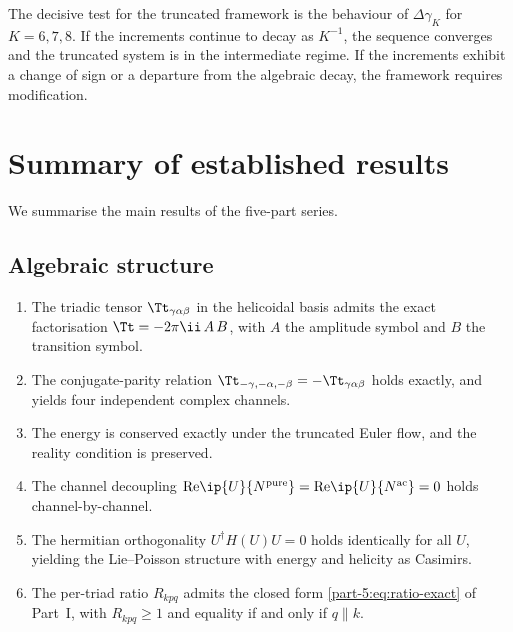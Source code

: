 \begin{remark}\label{part-5:rem:decisive}
The decisive test for the truncated framework is the behaviour of 
$\Delta\gamma_K$ for $K=6,7,8$. If the increments continue to decay 
as $K^{-1}$, the sequence converges and the truncated system is in 
the intermediate regime. If the increments exhibit a change of 
sign or a departure from the algebraic decay, the framework requires 
modification.
\end{remark}

\section{Summary of established results}
\label{part-5:sec:summary}

We summarise the main results of the five-part series.

\subsection{Algebraic structure}
\label{part-5:ssec:summary-algebraic}

\begin{enumerate}[label=(\Alph*),leftmargin=*]
\item The triadic tensor $\Tt_{\gamma\alpha\beta}$ in the helicoidal 
      basis admits the exact factorisation 
      $\Tt = -2\pi\ii\,A\,B$, with $A$ the amplitude symbol and $B$ 
      the transition symbol.
\item The conjugate-parity relation 
      $\Tt_{-\gamma,-\alpha,-\beta} = -\Tt_{\gamma\alpha\beta}$ holds 
      exactly, and yields four independent complex channels.
\item The energy is conserved exactly under the truncated Euler flow, 
      and the reality condition is preserved.
\item The channel decoupling 
      $\mathrm{Re}\ip{U}{N^{\mathrm{pure}}} = \mathrm{Re}\ip{U}{N^{\mathrm{ac}}} = 0$ 
      holds channel-by-channel.
\item The hermitian orthogonality $U^\dagger H(U)U = 0$ holds 
      identically for all $U$, yielding the Lie--Poisson structure 
      with energy and helicity as Casimirs.
\item The per-triad ratio $R_{kpq}$ admits the closed form 
      \eqref{part-5:eq:ratio-exact} of Part~I, with $R_{kpq}\geq 1$ and 
      equality if and only if $q\parallel k$.
\end{enumerate}

